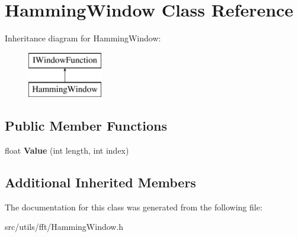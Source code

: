 \hypertarget{class_hamming_window}{}\section{Hamming\+Window Class Reference}
\label{class_hamming_window}
Inheritance diagram for Hamming\+Window\+:\begin{figure}[H]
\begin{center}
\leavevmode
\includegraphics[height=2.000000cm]{class_hamming_window}
\end{center}
\end{figure}
\subsection*{Public Member Functions}
\begin{DoxyCompactItemize}
\item 
\mbox{\label{class_hamming_window_abd8134832e9988be92d7be55595a473b}} 
float {\bfseries Value} (int length, int index)
\end{DoxyCompactItemize}
\subsection*{Additional Inherited Members}


The documentation for this class was generated from the following file\+:\begin{DoxyCompactItemize}
\item 
src/utils/fft/Hamming\+Window.\+h\end{DoxyCompactItemize}

